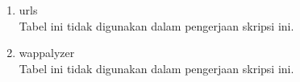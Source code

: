 \begin{enumerate}
	\item urls\\
	Tabel ini tidak digunakan dalam pengerjaan skripsi ini.
	\item wappalyzer\\
	Tabel ini tidak digunakan dalam pengerjaan skripsi ini.
\end{enumerate}



